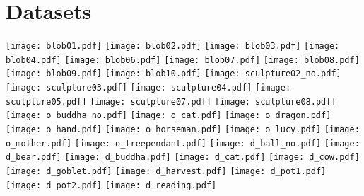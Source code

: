 \documentclass[preprint,12pt,authoryear]{elsarticle}
\begin{document}
\section{Datasets}
\label{sec:datasets}
\centering\texttt{[image: blob01.pdf]}
\centering\texttt{[image: blob02.pdf]}
\centering\texttt{[image: blob03.pdf]}
\centering\texttt{[image: blob04.pdf]}
\centering\texttt{[image: blob06.pdf]}
\centering\texttt{[image: blob07.pdf]}
\centering\texttt{[image: blob08.pdf]}
\centering\texttt{[image: blob09.pdf]}
\centering\texttt{[image: blob10.pdf]}
\centering\texttt{[image: sculpture02\_no.pdf]}
\centering\texttt{[image: sculpture03.pdf]}
\centering\texttt{[image: sculpture04.pdf]}
\centering\texttt{[image: sculpture05.pdf]}
\centering\texttt{[image: sculpture07.pdf]}
\centering\texttt{[image: sculpture08.pdf]}
\centering\texttt{[image: o\_buddha\_no.pdf]}
\centering\texttt{[image: o\_cat.pdf]}
\centering\texttt{[image: o\_dragon.pdf]}
\centering\texttt{[image: o\_hand.pdf]}
\centering\texttt{[image: o\_horseman.pdf]}
\centering\texttt{[image: o\_lucy.pdf]}
\centering\texttt{[image: o\_mother.pdf]}
\centering\texttt{[image: o\_treependant.pdf]}
\centering\texttt{[image: d\_ball\_no.pdf]}
\centering\texttt{[image: d\_bear.pdf]}
\centering\texttt{[image: d\_buddha.pdf]}
\centering\texttt{[image: d\_cat.pdf]}
\centering\texttt{[image: d\_cow.pdf]}
\centering\texttt{[image: d\_goblet.pdf]}
\centering\texttt{[image: d\_harvest.pdf]}
\centering\texttt{[image: d\_pot1.pdf]}
\centering\texttt{[image: d\_pot2.pdf]}
\centering\texttt{[image: d\_reading.pdf]}




\end{document}
